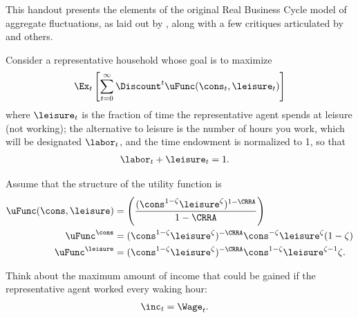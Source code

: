 
This handout presents the elements of the original
Real Business Cycle model of aggregate fluctuations, as laid out
by \cite{prescottTheoryAhead}, along with a few critiques articulated by \cite{summers:skeptical} and others.


Consider a representative household whose goal is to maximize
\begin{equation}
\Ex_{t} \left[\sum_{t=0}^{\infty} \Discount^{t}\uFunc(\cons_{t},\leisure_{t})      \right]
\end{equation}
where $\leisure_{t}$ is the fraction of time the representative agent spends at leisure (not working); the
alternative to leisure is the number of hours you work, which will be designated
$\labor_{t}$, and the time endowment is normalized to 1, so that
\begin{equation}\begin{gathered}\begin{aligned}
        \labor_{t}+\leisure_{t} & =  1.
\end{aligned}\end{gathered}\end{equation}

Assume that the structure of the utility function is
\begin{equation}\begin{gathered}\begin{aligned}
        \uFunc(\cons,\leisure) & =  \left(\frac{(\cons^{1-\zeta}\leisure^{\zeta})^{1-\CRRA}}{1-\CRRA}\right)
\\  \uFunc^{\cons}     & =  (\cons^{1-\zeta}\leisure^{\zeta})^{-\CRRA}\cons^{-\zeta}\leisure^{\zeta}(1-\zeta)
\\  \uFunc^{\leisure }  & =  (\cons^{1-\zeta}\leisure^{\zeta})^{-\CRRA}\cons^{1-\zeta}\leisure^{\zeta-1}\zeta.
\end{aligned}\end{gathered}\end{equation}

Think about the maximum amount of income that could be gained if the representative agent
worked every waking hour:
\begin{equation}\begin{gathered}\begin{aligned}
        \inc_{t} & =  \Wage_{t}.
\end{aligned}\end{gathered}\end{equation}

